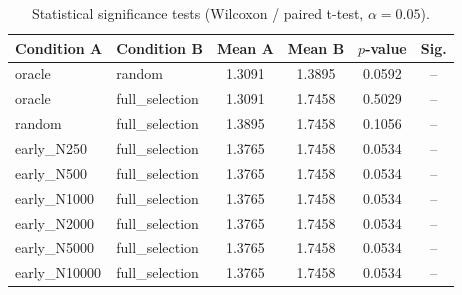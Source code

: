 \begin{table}[t]
\centering
\caption{Statistical significance tests (Wilcoxon / paired t-test, $\alpha=0.05$).}
\label{tab:rq4}
\small
\begin{tabular}{llcccc}
\toprule
Condition A & Condition B & Mean A & Mean B & $p$-value & Sig. \\
\midrule
oracle & random & 1.3091 & 1.3895 & 0.0592 & -- \\
oracle & full\_selection & 1.3091 & 1.7458 & 0.5029 & -- \\
random & full\_selection & 1.3895 & 1.7458 & 0.1056 & -- \\
early\_N250 & full\_selection & 1.3765 & 1.7458 & 0.0534 & -- \\
early\_N500 & full\_selection & 1.3765 & 1.7458 & 0.0534 & -- \\
early\_N1000 & full\_selection & 1.3765 & 1.7458 & 0.0534 & -- \\
early\_N2000 & full\_selection & 1.3765 & 1.7458 & 0.0534 & -- \\
early\_N5000 & full\_selection & 1.3765 & 1.7458 & 0.0534 & -- \\
early\_N10000 & full\_selection & 1.3765 & 1.7458 & 0.0534 & -- \\
\bottomrule
\end{tabular}
\end{table}